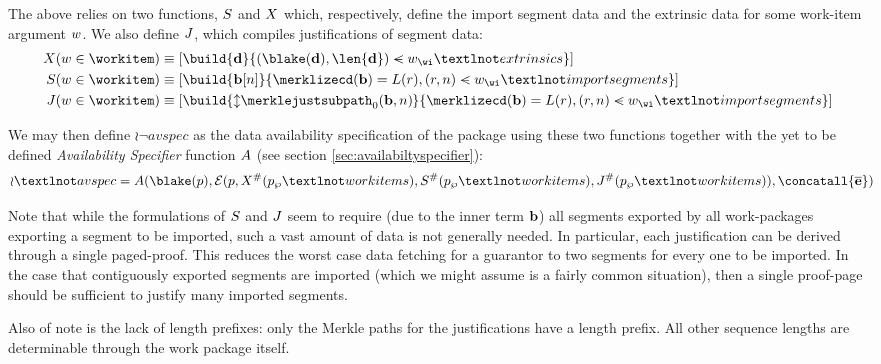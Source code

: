 The above relies on two functions, $S$ and $X$ which, respectively, define the import segment data and the extrinsic data for some work-item argument $w$. We also define $J$, which compiles justifications of segment data:
\begin{equation}
  \begin{aligned}
    \extrinsicdata(\wiX \in \workitem) &\equiv \sq{\build{\mathbf{d}}{(\blake(\mathbf{d}), \len{\mathbf{d}}) \orderedin \wiX_\wi¬extrinsics}} \\
    \importsegmentdata(\wiX \in \workitem) &\equiv \sq{\build{\segsX[n]}{\merklizecd(\segsX) = \segrootlookup(r), (r, n) \orderedin \wiX_\wi¬importsegments}} \\
    \justifysegmentdata(\wiX \in \workitem) &\equiv \sq{\build{\var{\merklejustsubpath_0(\segsX, n)}}{\merklizecd(\segsX) = \segrootlookup(r), (r, n) \orderedin \wiX_\wi¬importsegments}}
  \end{aligned}
\end{equation}

We may then define $\wr¬avspec$ as the data availability specification of the package using these two functions together with the yet to be defined \emph{Availability Specifier} function $A$ (see section \ref{sec:availabiltyspecifier}):
\begin{equation}
  \wr¬avspec = \newavailabilityspecifier(
    \blake(\wpX),
    \se(
      \wpX,
      \extrinsicdata^\#(\wpX_\wp¬workitems),
      \importsegmentdata^\#(\wpX_\wp¬workitems),
      \justifysegmentdata^\#(\wpX_\wp¬workitems)
    ),
    \concatall{\allexports}
  )\!\!\!\!
\end{equation}

Note that while the formulations of $S$ and $J$ seem to require (due to the inner term $\mathbf{b}$) all segments exported by all work-packages exporting a segment to be imported, such a vast amount of data is not generally needed. In particular, each justification can be derived through a single paged-proof. This reduces the worst case data fetching for a guarantor to two segments for every one to be imported. In the case that contiguously exported segments are imported (which we might assume is a fairly common situation), then a single proof-page should be sufficient to justify many imported segments.

Also of note is the lack of length prefixes: only the Merkle paths for the justifications have a length prefix. All other sequence lengths are determinable through the work package itself.

